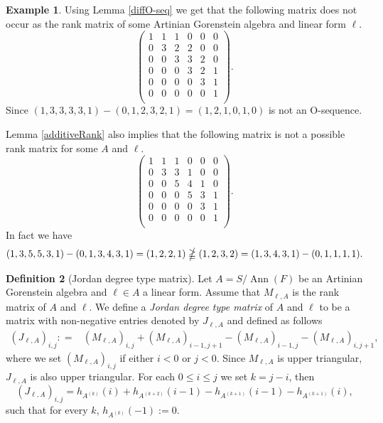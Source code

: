 \documentclass[12pt]{amsart}
\numberwithin{equation}{section}
\theoremstyle{plain} \newtheorem{theorem}{Theorem}[section]
\theoremstyle{definition} \newtheorem{definition}[theorem]{Definition}
\newtheorem{example}[theorem]{Example} \newtheorem{remark}[theorem]{Remark}
\DeclareMathOperator{\ann}{Ann}\DeclareMathOperator{\Char}{char}
\begin{document}
\begin{example}
Using Lemma \ref{diffO-seq} we get that the following matrix does not occur as the rank matrix of some Artinian Gorenstein algebra and linear form $\ell$.
$$ \begin{pmatrix}
1&1&1&0&0&0\\
0&3&2&2&0&0\\
0&0&3&3&2&0\\
0&0&0&3&2&1\\
0&0&0&0&3&1\\
0&0&0&0&0&1\\
\end{pmatrix}.
$$
Since $(1,3,3,3,3,1)-(0,1,2,3,2,1)=(1,2,1,0,1,0)$ is not an O-sequence.\par 
Lemma \ref{additiveRank} also implies that the following matrix is not a possible rank matrix for some $A$ and $\ell$.
$$ \begin{pmatrix}
1&1&1&0&0&0\\
0&3&3&1&0&0\\
0&0&5&4&1&0\\
0&0&0&5&3&1\\
0&0&0&0&3&1\\
0&0&0&0&0&1\\
\end{pmatrix}.
$$
In fact we have 
\begin{align*}
(1,3,5,5,3,1)-(0,1,3,4,3,1)=(1,2,2,1)\ngeqq (1,2,3,2)= (1,3,4,3,1)-(0,1,1,1,1).
\end{align*}
\end{example}
\begin{definition}[Jordan degree type matrix] Let $A=S/\ann(F)$ be an Artinian    Gorenstein algebra and $\ell\in A$ a linear form. Assume that $M_{\ell,A}$ is the rank matrix of $A$ and $\ell$. We define a \emph{Jordan degree type matrix} of $A$ and $\ell$ to be a matrix with non-negative entries denoted by $J_{\ell,A}$ and defined as follows
\begin{align}\label{J(A,l)definition}
(J_{\ell,A})_{i,j} :
=& (M_{\ell,A})_{i,j}+(M_{\ell,A})_{i-1,j+1}-(M_{\ell,A})_{i-1,j}-(M_{\ell,A})_{i,j+1},
\end{align}
where we set $(M_{\ell,A})_{i,j}$ if either  $i< 0$ or $j< 0$.
Since $M_{\ell,A}$ is upper triangular, $J_{\ell,A}$ is also upper triangular. For each $0\leq i\leq j$ we set $k=j-i$, then 
\begin{equation}\label{JDT_ij}
(J_{\ell,A})_{i,j} = h_{A^{(k)}}(i)+h_{A^{(k+2)}}(i-1)-h_{A^{(k+1)}}(i-1)-h_{A^{(k+1)}}(i),
\end{equation}
such that for every $k$, $h_{A^{(k)}}(-1):=0$.
\end{definition}
\end{document}
